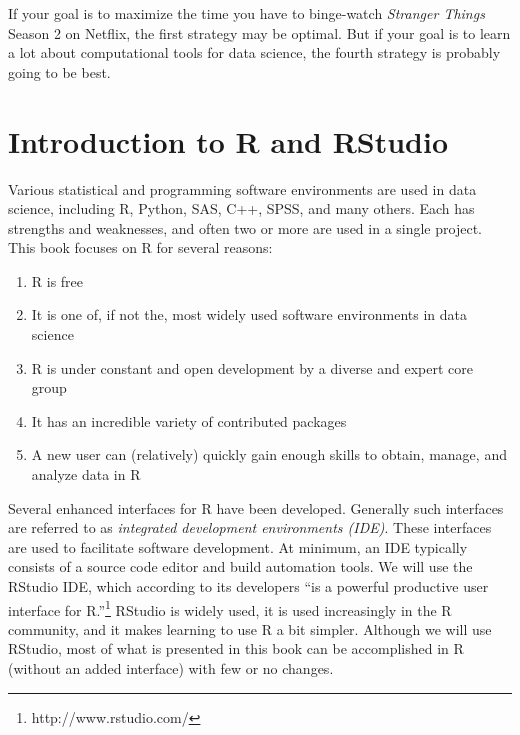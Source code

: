 \documentclass[12pt,oneside]{book}\usepackage[]{graphicx}\usepackage[]{color}
\newcommand{\be}{\begin{enumerate}}
\newcommand{\ee}{\end{enumerate}}
\begin{document}
If your goal is to maximize the time you have to binge-watch \emph{Stranger Things} Season 2 on Netflix, the first strategy may be optimal. But if your goal is to learn a lot about computational tools for data science, the fourth strategy is probably going to be best.


\chapter{Introduction to R and RStudio}

Various statistical and programming software environments are used in data science, including R, Python, SAS, C++, SPSS, and many others. Each has strengths and weaknesses, and often two or more are used in a single project. This book focuses on R for several reasons:
\be
  \item R is free
  \item It is one of, if not the, most widely used software environments in data science
  \item R is under constant and open development by a diverse and expert core group
  \item It has an incredible variety of contributed packages
  \item A new user can (relatively) quickly gain enough skills to obtain, manage, and analyze data in R
\ee

Several enhanced interfaces for R have been developed. Generally such interfaces are referred to as \textit{integrated development environments (IDE)}. These interfaces are used to facilitate software development. At minimum, an IDE typically consists of a source code editor and build automation tools. We will use the RStudio IDE, which according to its developers ``is a powerful productive user interface for R.''\footnote{http://www.rstudio.com/} RStudio is widely used, it is used increasingly in the R community, and it makes learning to use R a bit simpler. Although we will use RStudio, most of what is presented in this book can be accomplished in R (without an added interface) with few or no changes. 
\end{document}

